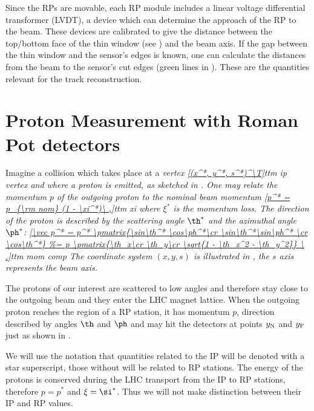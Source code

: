 Since the RPs are movable, each RP module includes a linear voltage differential transformer (LVDT), a device which can determine the approach of the RP to the beam. These devices are calibrated to give the distance between the top/bottom face of the thin window (see ) and the beam axis. If the gap between the thin window and the sensor's edges is known, one can calculate the distances from the beam to the sensor's cut edges (green lines in ). These are the quantities relevant for the track reconstruction.




\section[rp measurement]{Proton Measurement with Roman Pot detectors}



Imagine a collision which takes place at a \em{vertex}
\eqref{(x^*, y^*, s^*)^\T}{ttm ip vertex}
and where a proton is emitted, as sketched in . One may relate the momentum $p$ of the outgoing proton to the nominal beam momentum
\eqref{p^* = p_{\rm nom} (1 - \xi^*)\ ,}{ttm xi}
where $\xi^*$ is the \em{momentum loss}. The direction of the proton is described by the \em{scattering angle} $\th^*$ and the \em{azimuthal angle} $\ph^*$:
\eqref{\vec p^* = p^* \pmatrix{\sin\th^* \cos\ph^*\cr \sin\th^*\sin\ph^* \cr \cos\th^*}
\ .}{ttm mom comp}
The coordinate system $(x, y, s)$ is illustrated in , the $s$ axis represents the beam axis.

The protons of our interest are scattered to low angles and therefore stay close to the outgoing beam and they enter the LHC magnet lattice. When the outgoing proton reaches the region of a RP station, it has momentum $p$, direction described by angles $\th$ and $\ph$ and may hit the detectors at points $y_{\rm N}$ and $y_{\rm F}$ just as shown in .

We will use the notation that quantities related to the IP will be denoted with a star superscript, those without will be related to RP stations. The energy of the protons is conserved during the LHC transport from the IP to RP stations, therefore $p = p^*$ and $\xi = \si^*$. Thus we will not make distinction between their IP and RP values.

